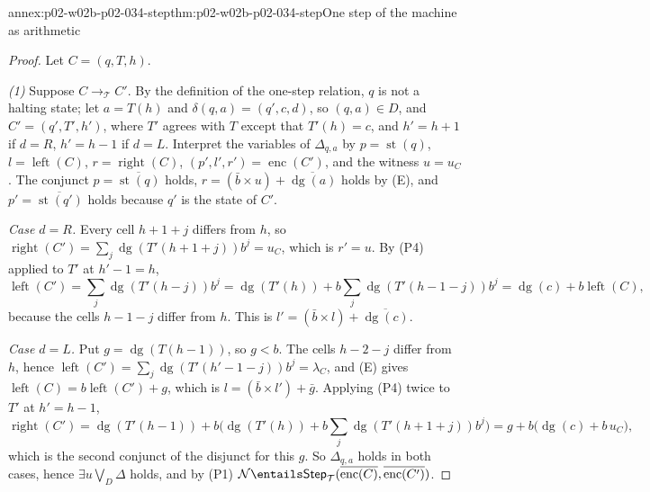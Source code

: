 \begin{annexitem}{annex:p02-w02b-p02-034-step}{thm:p02-w02b-p02-034-step}{One step of the machine as arithmetic}
\begin{proof}
Let \(C=(q,T,h)\).

\emph{(1)}  Suppose \(C\longrightarrow_{\mathcal T}C'\).  By the definition
of the one-step relation, \(q\) is not a halting state; let \(a=T(h)\) and
\(\delta(q,a)=(q',c,d)\), so \((q,a)\in D\), and \(C'=(q',T',h')\), where
\(T'\) agrees with \(T\) except that \(T'(h)=c\), and \(h'=h+1\) if \(d=R\),
\(h'=h-1\) if \(d=L\).  Interpret the variables of \(\Delta_{q,a}\) by
\(p=\operatorname{st}(q)\), \(l=\operatorname{left}(C)\),
\(r=\operatorname{right}(C)\), \((p',l',r')=\operatorname{enc}(C')\), and
the witness \(u=u_C\).  The conjunct \(p=\overline{\operatorname{st}(q)}\)
holds, \(r=(\bar b\times u)+\overline{\operatorname{dg}(a)}\) holds by (E),
and \(p'=\overline{\operatorname{st}(q')}\) holds because \(q'\) is the state
of \(C'\).

\emph{Case \(d=R\).}  Every cell \(h+1+j\) differs from \(h\), so
\(\operatorname{right}(C')=\sum_j\operatorname{dg}(T'(h+1+j))b^j=u_C\), which
is \(r'=u\).  By (P4) applied to \(T'\) at \(h'-1=h\),
\[
 \operatorname{left}(C')=\sum_j\operatorname{dg}(T'(h-j))b^j
 =\operatorname{dg}(T'(h))+b\sum_j\operatorname{dg}(T'(h-1-j))b^j
 =\operatorname{dg}(c)+b\operatorname{left}(C),
\]
because the cells \(h-1-j\) differ from \(h\).  This is
\(l'=(\bar b\times l)+\overline{\operatorname{dg}(c)}\).

\emph{Case \(d=L\).}  Put \(g=\operatorname{dg}(T(h-1))\), so \(g<b\).
The cells \(h-2-j\) differ from \(h\), hence
\(\operatorname{left}(C')=\sum_j\operatorname{dg}(T'(h'-1-j))b^j=\lambda_C\),
and (E) gives \(\operatorname{left}(C)=b\operatorname{left}(C')+g\), which is
\(l=(\bar b\times l')+\bar g\).  Applying (P4) twice to \(T'\) at \(h'=h-1\),
\[
 \operatorname{right}(C')
 =\operatorname{dg}(T'(h-1))+b\bigl(\operatorname{dg}(T'(h))+b\sum_j\operatorname{dg}(T'(h+1+j))b^j\bigr)
 =g+b\bigl(\operatorname{dg}(c)+b\,u_C\bigr),
\]
which is the second conjunct of the disjunct for this \(g\).  So
\(\Delta_{q,a}\) holds in both cases, hence \(\exists u\bigvee_D\Delta\) holds,
and by (P1)
\(\mathcal N\entails\mathsf{Step}_{\mathcal T}(\overline{\operatorname{enc}(C)},\overline{\operatorname{enc}(C')})\).


\end{proof}
\end{annexitem}
